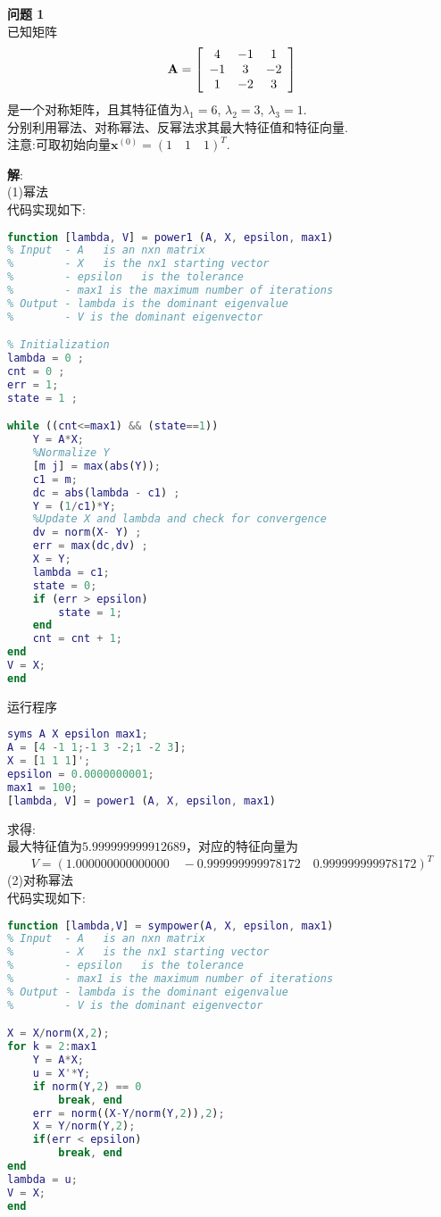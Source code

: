 \documentclass[UTF8]{ctexart}
\newenvironment{problem}[2][问题]
{\begin{mdframed}[backgroundcolor=gray!20] \textbf{#1 #2} \\}
	{\end{mdframed}}
\begin{document}
\begin{problem}{1}
	已知矩阵
	\begin{align}
		\mathbf{A}=\left[\begin{array}{ccc}
		4 & -1 & 1 \\
		-1 & 3 & -2 \\
		1 & -2 & 3
		\end{array}\right]\notag
	\end{align}
	是一个对称矩阵，且其特征值为$\lambda_1 = 6$, $\lambda_2 = 3$, $\lambda_3 = 1$.\\
	分别利用幂法、对称幂法、反幂法求其最大特征值和特征向量.\\
	注意:可取初始向量$\textbf{x}^{(0)}=(1\quad 1\quad 1)^{T}$.
\end{problem}
\textbf{解}:\\
(1)幂法\\
代码实现如下:
\begin{lstlisting}[language=matlab]
function [lambda, V] = power1 (A, X, epsilon, max1)
% Input  - A   is an nxn matrix
%        - X   is the nx1 starting vector
%        - epsilon   is the tolerance
%        - max1 is the maximum number of iterations
% Output - lambda is the dominant eigenvalue
%        - V is the dominant eigenvector

% Initialization
lambda = 0 ;
cnt = 0 ;
err = 1;
state = 1 ;

while ((cnt<=max1) && (state==1))
	Y = A*X;
	%Normalize Y
	[m j] = max(abs(Y));
	c1 = m;
	dc = abs(lambda - c1) ;
	Y = (1/c1)*Y;
	%Update X and lambda and check for convergence
	dv = norm(X- Y) ;
	err = max(dc,dv) ;
	X = Y;
	lambda = c1;
	state = 0;
	if (err > epsilon)
		state = 1;
	end
	cnt = cnt + 1;
end
V = X;
end
\end{lstlisting}
运行程序
\begin{lstlisting}[language=matlab]
syms A X epsilon max1;
A = [4 -1 1;-1 3 -2;1 -2 3];
X = [1 1 1]';
epsilon = 0.0000000001;
max1 = 100;
[lambda, V] = power1 (A, X, epsilon, max1)
\end{lstlisting}
求得:\\
最大特征值为$5.999999999912689$，对应的特征向量为
$$V=(1.000000000000000 \quad -0.999999999978172 \quad 0.999999999978172)^{T}$$
(2)对称幂法\\
代码实现如下:
\begin{lstlisting}[language=matlab]
function [lambda,V] = sympower(A, X, epsilon, max1)
% Input  - A   is an nxn matrix
%        - X   is the nx1 starting vector
%        - epsilon   is the tolerance
%        - max1 is the maximum number of iterations
% Output - lambda is the dominant eigenvalue
%        - V is the dominant eigenvector

X = X/norm(X,2);
for k = 2:max1
	Y = A*X;
	u = X'*Y;
	if norm(Y,2) == 0
		break, end
	err = norm((X-Y/norm(Y,2)),2);
	X = Y/norm(Y,2);
	if(err < epsilon)
		break, end
end
lambda = u;
V = X;
end
\end{lstlisting}
\end{document}
